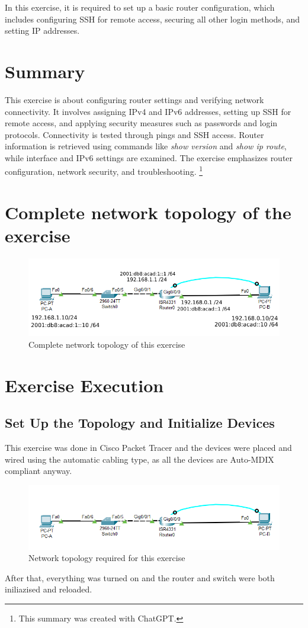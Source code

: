 \documentclass[a4paper]{article}
\newcommand{\abc}{\hfill \break}
\newcommand{\ii}{\textit}
\begin{document}
In this exercise, it is required to set up a basic router configuration, which includes configuring SSH for remote access, securing all other login methods, and setting IP addresses.

\section{Summary}

This exercise is about configuring router settings and verifying network connectivity. It involves assigning IPv4 and IPv6 addresses, setting up SSH for remote access, and applying security measures such as passwords and login protocols. Connectivity is tested through pings and SSH access. Router information is retrieved using commands like \ii{show version} and \ii{show ip route}, while interface and IPv6 settings are examined. The exercise emphasizes router configuration, network security, and troubleshooting. \footnote{This summary was created with ChatGPT.}
\newpage

\section{Complete network topology of the exercise}
\begin{figure}[h]
	\includegraphics[scale=0.65]{images/nwtopology2.png}
	\centering
	\caption{Complete network topology of this exercise}
\end{figure}

\newpage

\section{Exercise Execution}
\subsection{Set Up the Topology and Initialize Devices}
This exercise was done in Cisco Packet Tracer and the devices were placed and wired using the automatic cabling type, as all the devices are Auto-MDIX compliant anyway.\abc
\begin{figure}[h]
	\includegraphics[scale=0.45]{images/nwtopology.png}
	\centering
	\caption{Network topology required for this exercise}
\end{figure}\abc
After that, everything was turned on and the router and switch were both iniliazised and reloaded.
\end{document}
